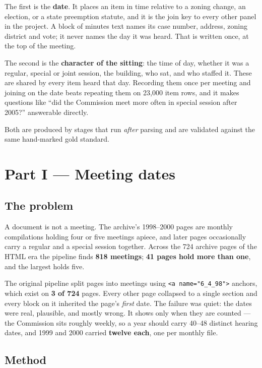 \documentclass[11pt]{article}
\begin{document}
The first is the \textbf{date}. It places an item in time relative to a zoning change, an
election, or a state preemption statute, and it is the join key to every other panel in the
project. A block of minutes text names its case number, address, zoning district and vote;
it never names the day it was heard. That is written once, at the top of the meeting.

The second is the \textbf{character of the sitting}: the time of day, whether it was a
regular, special or joint session, the building, who sat, and who staffed it. These are
shared by every item heard that day. Recording them once per meeting and joining on the
date beats repeating them on 23{,}000 item rows, and it makes questions like ``did the
Commission meet more often in special session after 2005?'' answerable directly.

Both are produced by stages that run \emph{after} parsing and are validated against the
same hand-marked gold standard.

\section{Part I --- Meeting dates}

\subsection{The problem}

A document is not a meeting. The archive's 1998--2000 pages are monthly compilations
holding four or five meetings apiece, and later pages occasionally carry a regular and a
special session together. Across the 724 archive pages of the HTML era the pipeline finds
\textbf{818 meetings}; \textbf{41 pages hold more than one}, and the largest holds five.

The original pipeline split pages into meetings using \verb|<a name="6_4_98">| anchors,
which exist on \textbf{3 of 724} pages. Every other page collapsed to a single section and
every block on it inherited the page's \emph{first} date. The failure was quiet: the dates
were real, plausible, and mostly wrong. It shows only when they are counted --- the
Commission sits roughly weekly, so a year should carry 40--48 distinct hearing dates, and
1999 and 2000 carried \textbf{twelve each}, one per monthly file.

\subsection{Method}
\end{document}
